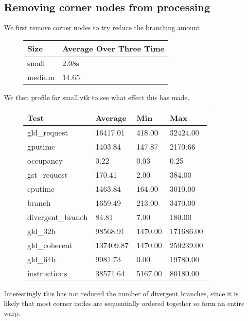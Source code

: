 \subsection*{Removing corner nodes from processing}
We first remove corner nodes to try reduce the branching amount\\
\begin{figure}[H]\centering \begin{tabular}{ l | l }
  \hline
  Size & Average Over Three Time \\
  \hline
  \hline
  small & 2.08s \\
  medium & 14.65 \\
  \hline
\end{tabular} \end{figure}

We then profile for small.vtk to see what effect this has made.\\
\begin{figure}[H]\centering \begin{tabular}{ l | l | l | l}
\hline
Test & Average & Min & Max \\
\hline
\hline
gld\_request & 16417.01 & 418.00 & 32424.00 \\
gputime & 1403.84 & 147.87 & 2170.66 \\
occupancy & 0.22 & 0.03 & 0.25 \\
gst\_request & 170.41 & 2.00 & 384.00 \\
cputime & 1463.84 & 164.00 & 3010.00 \\
branch & 1659.49 & 213.00 & 3470.00 \\
divergent\_branch & 84.81 & 7.00 & 180.00 \\
gld\_32b & 98568.91 & 1470.00 & 171686.00 \\
gld\_coherent & 137409.87 & 1470.00 & 250239.00 \\
gld\_64b & 9981.73 & 0.00 & 19780.00 \\
instructions & 38571.64 & 5167.00 & 80180.00 \\
\hline
\end{tabular} \end{figure}

Interestingly this has not reduced the number of divergent branches, since it is likely that most corner nodes are sequentially ordered together so form an entire warp.